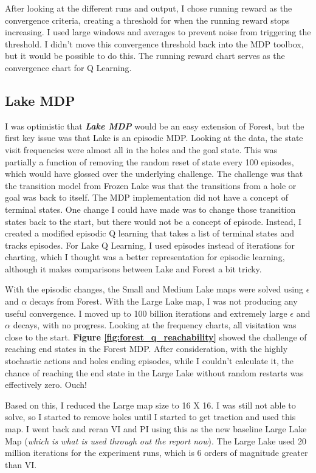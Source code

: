 \documentclass[letterpaper]{article} %
\begin{document}
After looking at the different runs and output, I chose running reward as the convergence criteria, creating a threshold for when the running reward stops increasing.  I used large windows and averages to prevent  noise from triggering the threshold.  I didn't move this convergence threshold back into the MDP toolbox, but it would be possible to do this.  The running reward chart serves as the convergence chart for Q Learning.

\subsection{Lake MDP} 
I was optimistic that \textbf{\emph{Lake MDP}} would be an easy extension of Forest, but the first key issue was that Lake is an episodic MDP.  Looking at the data, the state visit frequencies were almost all in the holes and the goal state.  This was partially a function of removing the random reset of state every 100 episodes, which would have glossed over the underlying challenge.  The challenge was that the transition model from Frozen Lake was that the transitions from a hole or goal was back to itself.  The MDP implementation did not have a concept of terminal states.  One change I could have made was to change those transition states back to the start, but there would not be a concept of episode.  Instead, I created a modified episodic Q learning that takes a list of terminal states and tracks episodes.  For Lake Q Learning, I used episodes instead of iterations for charting, which I thought was a better representation for episodic learning, although it makes comparisons between Lake and Forest  a bit tricky.

With the episodic changes, the Small and Medium Lake maps were solved using  $\epsilon$ and $\alpha$ decays from Forest.  With the Large Lake map, I was not producing any useful convergence.  I moved up to 100 billion iterations and extremely large $\epsilon$ and $\alpha$ decays, with no progress.  Looking at the frequency charts, all visitation was close to the start.   \textbf{Figure \ref{fig:forest_q_reachability}} showed the challenge of reaching end states in the Forest MDP.  After consideration, with the highly stochastic actions and holes ending episodes, while I couldn't calculate it, the chance of reaching the end state in the Large Lake without random restarts was effectively zero.  Ouch!

Based on this, I reduced the Large map size to 16 X 16.  I was still not able to solve, so I started to remove holes until I started to get traction and used this map. I went back and reran VI and PI using this as the new baseline Large Lake Map  (\emph{which is what is used through out the report now}).  The Large Lake used 20 million iterations for the experiment runs, which is 6 orders of magnitude greater than VI.
\end{document}
